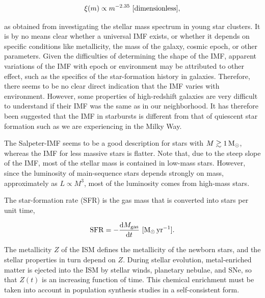 \documentclass[a4paper,10pt]{article}
\begin{document}
\begin{align*}
    \xi(m) \propto m^{-2.35} ~ [{\rm dimensionless}],
\end{align*}

{\noindent}as obtained from investigating the stellar mass spectrum in young star clusters. It is by no means clear whether a universal IMF exists, or whether it depends on specific conditions like metallicity, the mass of the galaxy, cosmic epoch, or other parameters. Given the difficulties of determining the shape of the IMF, apparent variations of the IMF with epoch or environment may be attributed to other effect, such as the specifics of the star-formation history in galaxies. Therefore, there seems to be no clear direct indication that the IMF varies with environment. However, some properties of high-redshift galaxies are very difficult to understand if their IMF was the same as in our neighborhood. It has therefore been suggested that the IMF in starbursts is different from that of quiescent star formation such as we are experiencing in the Milky Way.

{\noindent}The Salpeter-IMF seems to be a good description for stars with $M\gtrsim1\,{\rm M_\odot}$, whereas the IMF for less massive stars is flatter. Note that, due to the steep slope of the IMF, most of the stellar mass is contained in low-mass stars. However, since the luminosity of main-sequence stars depends strongly on mass, approximately as $L\propto M^3$, most of the luminosity comes from high-mass stars.

{\noindent}The star-formation rate (SFR) is the gas mass that is converted into stars per unit time,

\begin{align*}
    \mathrm{SFR} = -\frac{\mathrm{d}M_\mathrm{gas}}{\mathrm{d}t} ~ [{\rm M_\odot\,yr^{-1}}].
\end{align*}

{\noindent}The metallicity $Z$ of the ISM defines the metallicity of the newborn stars, and the stellar properties in turn depend on $Z$. During stellar evolution, metal-enriched matter is ejected into the ISM by stellar winds, planetary nebulae, and SNe, so that $Z(t)$ is an increasing function of time. This chemical enrichment must be taken into account in population synthesis studies in a self-consistent form.
\end{document}
